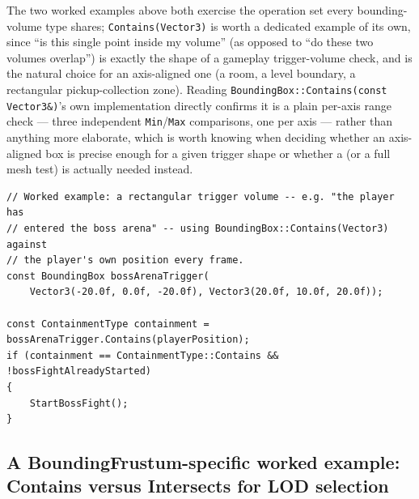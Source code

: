 The two worked examples above both exercise the operation set every bounding-volume type
shares; \texttt{Contains(Vector3)} is worth a dedicated example of its own, since ``is this
single point inside my volume'' (as opposed to ``do these two volumes overlap'') is exactly
the shape of a gameplay trigger-volume check, and  is the natural choice
for an axis-aligned one (a room, a level boundary, a rectangular pickup-collection zone).
Reading \texttt{BoundingBox::Contains(const Vector3\&)}'s own implementation directly confirms
it is a plain per-axis range check --- three independent \texttt{Min}/\texttt{Max}
comparisons, one per axis --- rather than anything more elaborate, which is worth knowing when
deciding whether an axis-aligned box is precise enough for a given trigger shape or whether a
 (or a full mesh test) is actually needed instead.

\begin{lstlisting}
// Worked example: a rectangular trigger volume -- e.g. "the player has
// entered the boss arena" -- using BoundingBox::Contains(Vector3) against
// the player's own position every frame.
const BoundingBox bossArenaTrigger(
    Vector3(-20.0f, 0.0f, -20.0f), Vector3(20.0f, 10.0f, 20.0f));

const ContainmentType containment = bossArenaTrigger.Contains(playerPosition);
if (containment == ContainmentType::Contains && !bossFightAlreadyStarted)
{
    StartBossFight();
}
\end{lstlisting}

\subsection{A BoundingFrustum-specific worked example: Contains versus Intersects for LOD selection}

